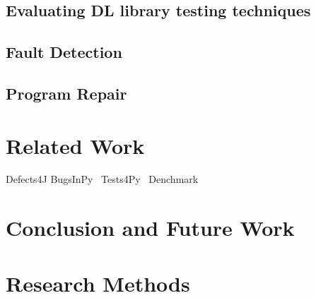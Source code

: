 \documentclass[sigconf]{acmart}
\begin{document}
\subsection{Evaluating DL library testing techniques}
\subsection{Fault Detection}
\subsection{Program Repair}


\section{Related Work} 
Defects4J\cite{just2014defects4j}
BugsInPy~\cite{widyasari2020bugsinpy}
Tests4Py~\cite{smytzek2024tests4py}
Denchmark~\cite{kim2021denchmark}



\section{Conclusion and Future Work}




\appendix

\section{Research Methods}
\end{document}
